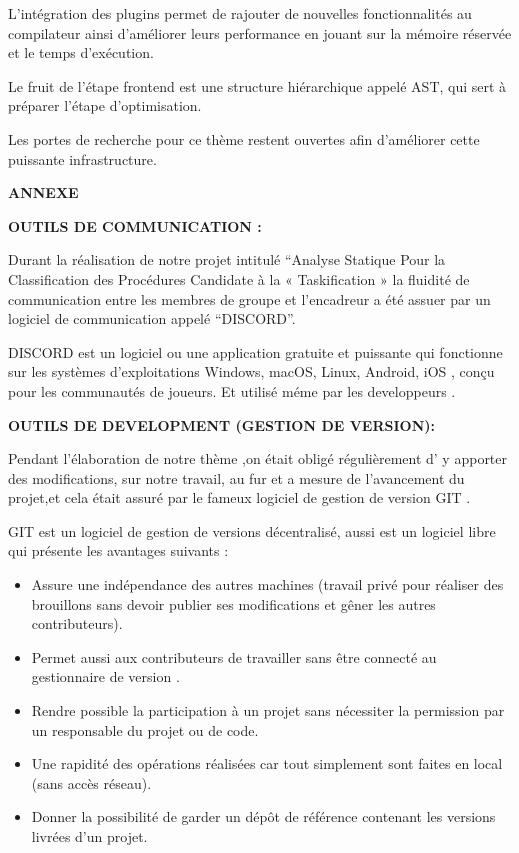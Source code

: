 \documentclass[12pt,titlepage]{article}
\begin{document}
L'intégration des plugins permet de rajouter de nouvelles fonctionnalités au compilateur ainsi d'améliorer leurs performance en jouant sur la mémoire réservée et le temps d'exécution.
 
Le fruit de l'étape frontend est une structure hiérarchique appelé AST, qui sert à préparer l'étape d'optimisation.

Les portes de recherche pour ce thème restent ouvertes afin d'améliorer cette puissante infrastructure. 

\pagebreak


{ \huge \bfseries \center  ANNEXE
	\\[0.15cm] }


\textbf{OUTILS DE COMMUNICATION :}

Durant la réalisation de notre projet intitulé “Analyse Statique Pour la Classification des Procédures Candidate à la « Taskification » la fluidité de communication entre les membres de groupe et l’encadreur a été assuer par un logiciel de communication appelé “DISCORD”.

DISCORD est un logiciel ou une application gratuite et puissante  qui  fonctionne sur les systèmes d’exploitations Windows, macOS, Linux, Android, iOS , conçu pour les communautés de joueurs. Et utilisé méme par les developpeurs .

\textbf{OUTILS DE DEVELOPMENT (GESTION DE VERSION):}



Pendant l’élaboration de notre thème ,on était obligé régulièrement d’ y apporter des modifications, sur notre travail, au fur et a mesure de l’avancement du projet,et cela était assuré par le fameux logiciel de gestion de version GIT .

GIT est un logiciel de gestion de versions décentralisé, aussi est un logiciel libre qui présente les avantages suivants :

\begin{itemize}
      \item Assure une indépendance des autres machines (travail privé pour réaliser des brouillons sans devoir publier ses modifications et gêner les autres contributeurs).
      \item Permet aussi aux contributeurs de travailler sans être connecté au gestionnaire de version .
      \item Rendre possible  la participation à un projet sans nécessiter la permission par un responsable du projet ou de code.
      \item Une rapidité des opérations réalisées car tout simplement sont faites en local (sans accès réseau).
      \item Donner la possibilité de garder un dépôt de référence contenant les versions livrées d'un projet.

 \end{itemize}


\pagebreak 

\nocite{*} 



\end{document}
